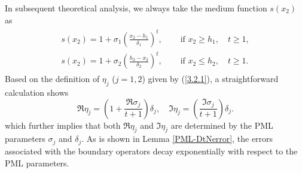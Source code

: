 \documentclass[final,3p,times]{elsarticle}
\begin{document}
In subsequent theoretical analysis, we always take the medium function $s(x_2)$ as 
\begin{align*}
	\begin{array}{ll}
		s(x_2) = 1+\sigma_1 \left(\frac{x_2-h_1}{\delta_1}\right)^t, & \quad\text { if } x_2 \geq h_1,\quad t \geq 1, \\
		s(x_2) = 1+\sigma_2 \left(\frac{h_2-x_2}{\delta_2}\right)^t, & \quad\text { if } x_2 \leq h_2,\quad t \geq 1.
	\end{array}
\end{align*}
Based on the definition of $\eta_j$ ($j=1,2$) given by (\ref{3.2.1}), a straightforward calculation shows
$$
\Re \eta_j=\left(1+\frac{\Re \sigma_j}{t+1}\right) \delta_j, \quad \Im \eta_j=\left(\frac{\Im \sigma_j}{t+1}\right) \delta_j.
$$
which further implies that both $\Re{\eta_j}$ and $\Im{\eta_j}$ are determined by the PML parameters $\sigma_j$ and $\delta_j$. As is shown in Lemma \ref{PML-DtNerror}, the errors associated with the boundary operators decay exponentially with respect to the PML parameters.
\end{document}
